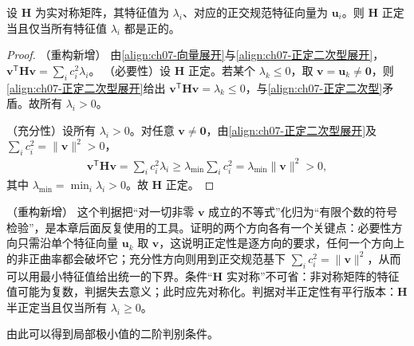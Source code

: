 \documentclass[../../main.tex]{subfiles}
\begin{document}
\begin{proposition}[正定性的特征值判据]\label{proposition:ch07-正定判据}
设 $\mathbf{H}$ 为实对称矩阵，其特征值为 $\lambda_i$、对应的正交规范特征向量为 $\mathbf{u}_i$。则 $\mathbf{H}$ 正定当且仅当所有特征值 $\lambda_i$ 都是正的。
\end{proposition}
\begin{proof}（重构新增）
由\eqref{align:ch07-向量展开}与\eqref{align:ch07-正定二次型展开}，$\mathbf{v}^{\mathsf T}\mathbf{H}\mathbf{v}=\sum_ic_i^{2}\lambda_i$。
（必要性）设 $\mathbf{H}$ 正定。若某个 $\lambda_k\leqslant0$，取 $\mathbf{v}=\mathbf{u}_k\neq\mathbf{0}$，则\eqref{align:ch07-正定二次型展开}给出 $\mathbf{v}^{\mathsf T}\mathbf{H}\mathbf{v}=\lambda_k\leqslant0$，与\eqref{align:ch07-正定二次型}矛盾。故所有 $\lambda_i>0$。

（充分性）设所有 $\lambda_i>0$。对任意 $\mathbf{v}\neq\mathbf{0}$，由\eqref{align:ch07-正定二次型展开}及 $\sum_ic_i^{2}=\|\mathbf{v}\|^{2}>0$，
\begin{align*}
\mathbf{v}^{\mathsf T}\mathbf{H}\mathbf{v} = \sum_i c_i^{2}\lambda_i \geqslant \lambda_{\min}\sum_i c_i^{2} = \lambda_{\min}\|\mathbf{v}\|^{2} > 0,
\end{align*}
其中 $\lambda_{\min}=\min_i\lambda_i>0$。故 $\mathbf{H}$ 正定。
\end{proof}

\begin{remark}（重构新增）
这个判据把“对一切非零 $\mathbf{v}$ 成立的不等式”化归为“有限个数的符号检验”，是本章后面反复使用的工具。证明的两个方向各有一个关键点：必要性方向只需沿单个特征向量 $\mathbf{u}_k$ 取 $\mathbf{v}$，这说明正定性是逐方向的要求，任何一个方向上的非正曲率都会破坏它；充分性方向则用到正交规范基下 $\sum_ic_i^{2}=\|\mathbf{v}\|^{2}$，从而可以用最小特征值给出统一的下界。条件“$\mathbf{H}$ 实对称”不可省：非对称矩阵的特征值可能为复数，判据失去意义；此时应先对称化。判据对半正定性有平行版本：$\mathbf{H}$ 半正定当且仅当所有 $\lambda_i\geqslant0$。
\end{remark}

由此可以得到局部极小值的二阶判别条件。
\end{document}
